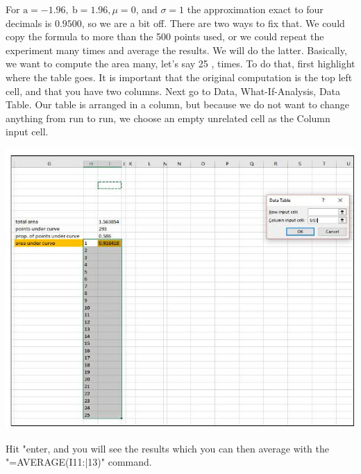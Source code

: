 \documentclass[10pt]{article}
\begin{document}
For $\mathrm{a}=-1.96, \mathrm{~b}=1.96, \mu=0$, and $\sigma=1$ the approximation exact to four decimals is $0.9500$, so we are a bit off. There are two ways to fix that. We could copy the formula to more than the 500 points used, or we could repeat the experiment many times and average the results. We will do the latter. Basically, we want to compute the area many, let's say 25 , times. To do that, first highlight where the table goes. It is important that the original computation is the top left cell, and that you have two columns. Next go to Data, What-If-Analysis, Data Table. Our table is arranged in a column, but because we do not want to change anything from run to run, we choose an empty unrelated cell as the Column input cell.

\includegraphics[max width=\textwidth]{2022_07_05_5945264bba2a5f6ba667g-20(1)}

Hit "enter, and you will see the results which you can then average with the "=AVERAGE(I11:|13)" command.
\end{document}
